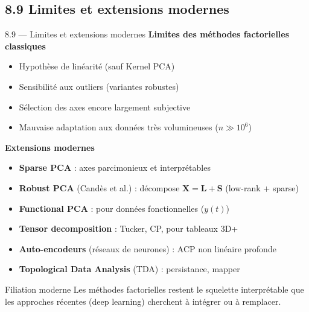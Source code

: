 \subsection{8.9 Limites et extensions modernes}
\begin{frame}{8.9 — Limites et extensions modernes}
\textbf{Limites des méthodes factorielles classiques}
\begin{itemize}\small
  \item Hypothèse de \alert{linéarité} (sauf Kernel PCA)
  \item Sensibilité aux \alert{outliers} (variantes robustes)
  \item Sélection des \alert{axes} encore largement subjective
  \item Mauvaise adaptation aux données \alert{très volumineuses} ($n \gg 10^6$)
\end{itemize}

\vspace{0.2cm}
\textbf{Extensions modernes}
\begin{itemize}\small
  \item \textbf{Sparse PCA} : axes parcimonieux et interprétables
  \item \textbf{Robust PCA} (Candès et al.) : décompose $\mathbf{X} = \mathbf{L} + \mathbf{S}$
        (low-rank + sparse)
  \item \textbf{Functional PCA} : pour données fonctionnelles ($y(t)$)
  \item \textbf{Tensor decomposition} : Tucker, CP, pour tableaux 3D+
  \item \textbf{Auto-encodeurs} (réseaux de neurones) : ACP non linéaire profonde
  \item \textbf{Topological Data Analysis} (TDA) : persistance, mapper
\end{itemize}

\begin{block}{Filiation moderne}
\small Les méthodes factorielles restent \alert{le squelette} interprétable que
les approches récentes (deep learning) cherchent à intégrer ou à remplacer.
\end{block}
\end{frame}

